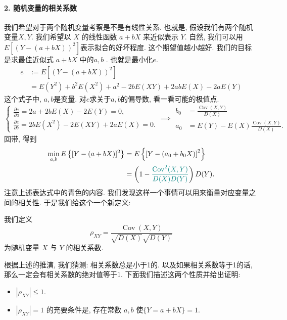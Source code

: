 \paragraph{2. 随机变量的相关系数} 我们希望对于两个随机变量考察是不是有线性关系. 也就是, 假设我们有两个随机变量$X,Y$. 我们希望以 $X$ 的线性函数 $a+b X$ 来近似表示 $Y$. 自然, 我们可以用$E\left[(Y-(a+b X))^2\right]$表示拟合的好坏程度. 这个期望值越小越好. 我们的目标是求最佳近似式 $a+b X$ 中的$a,b$ .
也就是最小化$e$.
 $$
\begin{aligned}
e & :=E\left[(Y-(a+b X))^2\right] \\
& =E\left(Y^2\right)+b^2 E\left(X^2\right)+a^2-2 b E(X Y)+2 a b E(X)-2 a E(Y)
\end{aligned}
$$
这个式子中, $a,b$是变量. 对$e$求关于$a,b $的偏导数, 看一看可能的极值点.
$$
\left\{\begin{array}{l}
\frac{\partial e}{\partial a}=2 a+2 b E(X)-2 E(Y)=0, \\
\frac{\partial e}{\partial b}=2 b E\left(X^2\right)-2 E(X Y)+2 a E(X)=0 .
\end{array}\right. \implies \begin{array}{ll}
b_0 & =\frac{\operatorname{Cov}(X, Y)}{D(X)} \\
a_0 & =E(Y)-E(X) \frac{\operatorname{Cov}(X, Y)}{D(X)} .
\end{array}
$$
回带, 得到
$$
\begin{aligned}
\min _{a, b} E\left\{[Y-(a+b X)]^2\right\} & =E\left\{\left[Y-\left(a_0+b_0 X\right)\right]^2\right\} \\
& =\left(1-{{\color{teal}\frac{\operatorname{Cov}^2(X, Y)}{{D(X)} {D(Y)}}}}\right) D(Y)  .
\end{aligned}
$$
注意上述表达式中的青色的内容. 我们发现这样一个事情可以用来衡量对应变量之间的相关性. 于是我们给这个一个新定义: 

\begin{definition}
    我们定义
    $$
    \rho_{X Y}=\frac{\operatorname{Cov}(X, Y)}{\sqrt{D(X)} \sqrt{D(Y)}}
    $$
    为随机变量 $X$ 与 $Y$ 的相关系数.
\end{definition}

根据上述的推演, 我们猜测: 相关系数总是小于1的. 以及如果相关系数等于1的话, 那么一定会有相关系数的绝对值等于1. 下面我们描述这两个性质并给出证明: 

\begin{itemize}
    \item $\left|\rho_{X Y}\right| \leq 1$.
    \item $\left|\rho_{X Y}\right|=1$ 的充要条件是, 存在常数 $a, b$ 使$\{Y=a+b X\}=1$.
\end{itemize}


